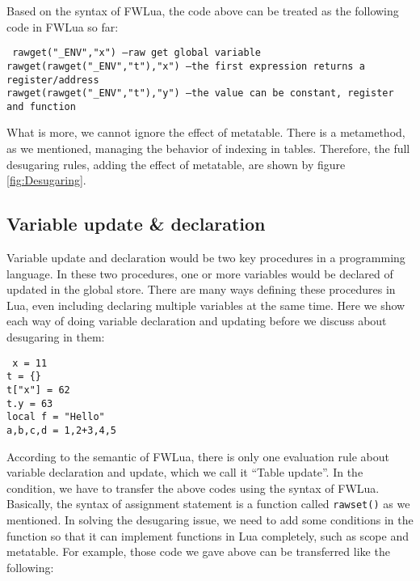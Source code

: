 \documentclass{article}
\begin{document}
Based on the syntax of FWLua, the code above can be treated as the following code in FWLua so far:
\begin{flushleft}
{\tt
rawget("\_ENV","x") --raw get global variable\\
rawget(rawget("\_ENV","t"),"x") --the first expression returns a register/address\\
rawget(rawget("\_ENV","t"),"y") --the value can be constant, register and function\\
}
\end{flushleft}

What is more, we cannot ignore the effect of metatable. There is a metamethod, as we mentioned, managing the behavior of indexing in tables. Therefore, the full desugaring rules, adding the effect of metatable, are shown by figure \ref{fig:Desugaring}.


\subsection{Variable update \& declaration}
Variable update and declaration would be two key procedures in a programming language. In these two procedures, one or more variables would be declared of updated in the global store. There are many ways defining these procedures in Lua, even including declaring multiple variables at the same time. Here we show each way of doing variable declaration and updating before we discuss about desugaring in them:

\begin{flushleft}
{\tt
x = 11\\
t = \{\}\\
t["x"] = 62\\
t.y = 63\\
local f = "Hello"\\
a,b,c,d = 1,2+3,4,5\\ 
}
\end{flushleft}
According to the semantic of FWLua, there is only one evaluation rule about variable declaration and update, which we call it ``Table update''. In the condition, we have to transfer the above codes using the syntax of FWLua. Basically, the syntax of assignment statement is a function called {\tt rawset()} as we mentioned. In solving the desugaring issue, we need to add some conditions in the function so that it can implement functions in Lua completely, such as scope and metatable. For example, those code we gave above can be transferred like the following:
\end{document}
